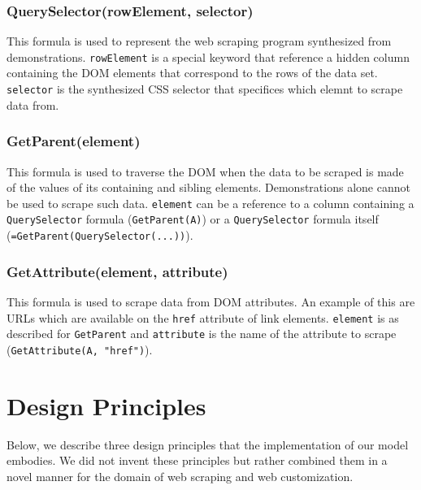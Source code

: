 \documentclass[sigconf,10pt]{acmart}
\begin{document}
\hypertarget{queryselectorrowelement-selector}{%
\subsubsection{QuerySelector(rowElement,
selector)}\label{queryselectorrowelement-selector}}

This formula is used to represent the web scraping program synthesized
from demonstrations. \texttt{rowElement} is a special keyword that
reference a hidden column containing the DOM elements that correspond to
the rows of the data set. \texttt{selector} is the synthesized CSS
selector that specifices which elemnt to scrape data from.

\hypertarget{getparentelement}{%
\subsubsection{GetParent(element)}\label{getparentelement}}

This formula is used to traverse the DOM when the data to be scraped is
made of the values of its containing and sibling elements.
Demonstrations alone cannot be used to scrape such data.
\texttt{element} can be a reference to a column containing a
\texttt{QuerySelector} formula (\texttt{GetParent(A)}) or a
\texttt{QuerySelector} formula itself
(\texttt{=GetParent(QuerySelector(...))}).

\hypertarget{getattributeelement-attribute}{%
\subsubsection{GetAttribute(element,
attribute)}\label{getattributeelement-attribute}}

This formula is used to scrape data from DOM attributes. An example of
this are URLs which are available on the \texttt{href} attribute of link
elements. \texttt{element} is as described for \texttt{GetParent} and
\texttt{attribute} is the name of the attribute to scrape
(\texttt{GetAttribute(A,\ "href")}).

\hypertarget{sec:design-principles}{%
\section{Design Principles}\label{sec:design-principles}}

Below, we describe three design principles that the implementation of
our model embodies. We did not invent these principles but rather
combined them in a novel manner for the domain of web scraping and web
customization.
\end{document}
